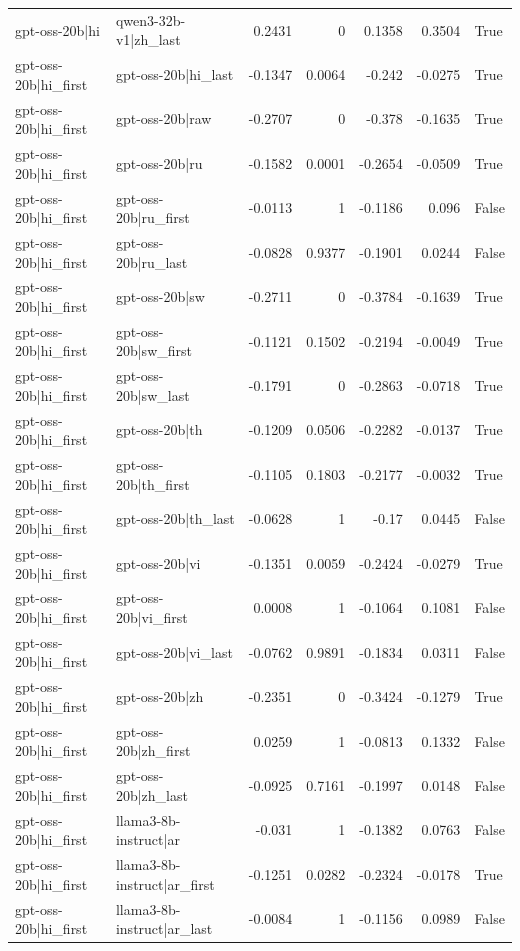 \begin{table}
\begin{tabular}{l l r r r r l}
gpt-oss-20b|hi & qwen3-32b-v1|zh_last & 0.2431 & 0 & 0.1358 & 0.3504 & True \\
gpt-oss-20b|hi_first & gpt-oss-20b|hi_last & -0.1347 & 0.0064 & -0.242 & -0.0275 & True \\
gpt-oss-20b|hi_first & gpt-oss-20b|raw & -0.2707 & 0 & -0.378 & -0.1635 & True \\
gpt-oss-20b|hi_first & gpt-oss-20b|ru & -0.1582 & 0.0001 & -0.2654 & -0.0509 & True \\
gpt-oss-20b|hi_first & gpt-oss-20b|ru_first & -0.0113 & 1 & -0.1186 & 0.096 & False \\
gpt-oss-20b|hi_first & gpt-oss-20b|ru_last & -0.0828 & 0.9377 & -0.1901 & 0.0244 & False \\
gpt-oss-20b|hi_first & gpt-oss-20b|sw & -0.2711 & 0 & -0.3784 & -0.1639 & True \\
gpt-oss-20b|hi_first & gpt-oss-20b|sw_first & -0.1121 & 0.1502 & -0.2194 & -0.0049 & True \\
gpt-oss-20b|hi_first & gpt-oss-20b|sw_last & -0.1791 & 0 & -0.2863 & -0.0718 & True \\
gpt-oss-20b|hi_first & gpt-oss-20b|th & -0.1209 & 0.0506 & -0.2282 & -0.0137 & True \\
gpt-oss-20b|hi_first & gpt-oss-20b|th_first & -0.1105 & 0.1803 & -0.2177 & -0.0032 & True \\
gpt-oss-20b|hi_first & gpt-oss-20b|th_last & -0.0628 & 1 & -0.17 & 0.0445 & False \\
gpt-oss-20b|hi_first & gpt-oss-20b|vi & -0.1351 & 0.0059 & -0.2424 & -0.0279 & True \\
gpt-oss-20b|hi_first & gpt-oss-20b|vi_first & 0.0008 & 1 & -0.1064 & 0.1081 & False \\
gpt-oss-20b|hi_first & gpt-oss-20b|vi_last & -0.0762 & 0.9891 & -0.1834 & 0.0311 & False \\
gpt-oss-20b|hi_first & gpt-oss-20b|zh & -0.2351 & 0 & -0.3424 & -0.1279 & True \\
gpt-oss-20b|hi_first & gpt-oss-20b|zh_first & 0.0259 & 1 & -0.0813 & 0.1332 & False \\
gpt-oss-20b|hi_first & gpt-oss-20b|zh_last & -0.0925 & 0.7161 & -0.1997 & 0.0148 & False \\
gpt-oss-20b|hi_first & llama3-8b-instruct|ar & -0.031 & 1 & -0.1382 & 0.0763 & False \\
gpt-oss-20b|hi_first & llama3-8b-instruct|ar_first & -0.1251 & 0.0282 & -0.2324 & -0.0178 & True \\
gpt-oss-20b|hi_first & llama3-8b-instruct|ar_last & -0.0084 & 1 & -0.1156 & 0.0989 & False \\

\end{tabular}
\end{table}
